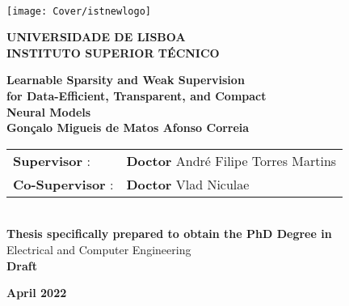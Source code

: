 \setcounter{page}{1} 


\thispagestyle{empty}
\begin{flushleft} ~\\ \vspace{-12mm} \hspace{-12mm}  \texttt{[image: Cover/istnewlogo]}

    \vspace{5mm}
    \centering
    \Large \textbf{UNIVERSIDADE DE LISBOA \\ INSTITUTO SUPERIOR TÉCNICO}
    \vspace{30mm}


    \centering
    \Large \textbf{Learnable Sparsity and Weak Supervision\\for Data-Efficient, Transparent, and Compact\\Neural Models}
    \\ \vspace{25mm}  %
    \large \textbf{Gonçalo Migueis de Matos Afonso Correia} \\
    \vspace{35mm}

    \begin{minipage}{\textwidth}
        \begin{tabularx}{\textwidth}{ l @{ } l }
            \textbf{Supervisor} :    & \textbf{Doctor} André Filipe Torres Martins \\
            \textbf{Co-Supervisor} : & \textbf{Doctor} Vlad Niculae                \\
        \end{tabularx}
    \end{minipage}
    \\ \vspace{20mm}
    \centering
    \large \textbf{Thesis specifically prepared to obtain the PhD Degree in}\\
    \large Electrical and Computer Engineering\\
    \vspace{18mm}
    \Large \textbf{Draft}

    \vspace{15mm}

    \large \textbf{April 2022} \\
    \let\thepage\relax
\end{flushleft}
\pagebreak
